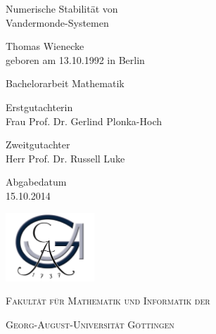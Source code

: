 \begin{titlepage}
    \begin{center}
        \vspace*{3em}

        { \huge Numerische Stabilität von\\[0.5em]
            Vandermonde-Systemen}
        \vspace{3em}

        \Large{Thomas Wienecke}\\[0.5em]
        \normalsize{geboren am 13.10.1992 in Berlin}
        \vspace{3em}

        \Large{Bachelorarbeit Mathematik}
        \vfill

        \normalsize{Erstgutachterin}\\[0.5em]
        \large{Frau Prof. Dr. Gerlind Plonka-Hoch}

        \vspace{1em}
        \normalsize{Zweitgutachter}\\[0.5em]
        \large{Herr Prof. Dr. Russell Luke}

        \vspace{1em}
        \normalsize{Abgabedatum}\\[0.5em]
        \large{15.10.2014}

        \vspace{3em}

        \includegraphics[width=0.25\textwidth]{images/logo.jpg}\\[0.5em]
        \centerline{{\large\scshape Fakultät für Mathematik und Informatik der}}
        \vspace{0.5em}
        \centerline{{\large\scshape Georg-August-Universität Göttingen}}
    \end{center}
\end{titlepage}
\newpage
{}
